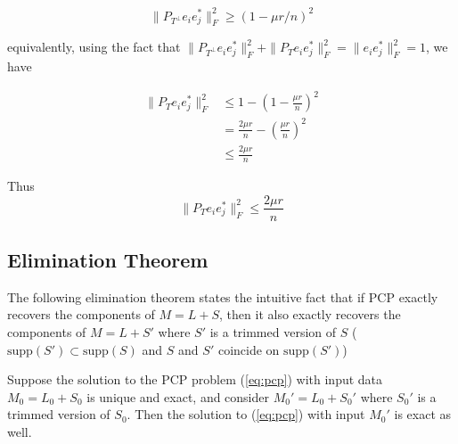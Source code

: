 \begin{equation}
\|P_{T^\perp} e_ie_j^*\|_F^2 \geq (1 - \mu r / n)^2   \label{property: p3}
\end{equation}

equivalently, using the fact that $\|P_{T^\perp} e_ie_j^*\|_F^2 + \|P_{T} e_ie_j^*\|_F^2 = \|e_ie_j^*\|_F^2 = 1$, we have

\begin{align*}
\|P_{T} e_ie_j^*\|_F^2
&\leq 1 - (1 - \frac{\mu r}{n})^2 \\
&= \frac{2\mu r}{n} - \left( \frac{\mu r}{n} \right)^2 \\
&\leq \frac{2\mu r}{n}
\end{align*}

Thus
\begin{equation}
  \|P_{T} e_ie_j^*\|_F^2 \leq \frac{2\mu r}{n}   \label{property: p4}
\end{equation}
\subsection{Elimination Theorem}
The following elimination theorem states the intuitive fact that if PCP exactly recovers the components of $M = L+S$, then it also exactly recovers the components of $M = L+S'$ where $S'$ is a trimmed version of $S$ ($\text{supp}(S')\subset \text{supp}(S)$ and $S$ and $S'$ coincide on $\text{supp}(S')$)

\begin{theorem}
Suppose the solution to the PCP problem (\ref{eq:pcp}) with input data $M_0 = L_0 + S_0$ is unique and exact, and consider $M_0' = L_0 + S_0'$ where $S_0'$ is a trimmed version of $S_0$. Then the solution to (\ref{eq:pcp}) with input $M_0'$ is exact as well.
\end{theorem}

